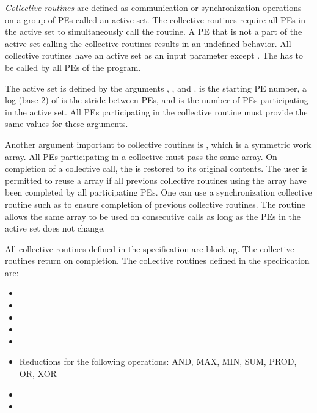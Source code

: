 \emph{Collective routines} are defined as communication or synchronization
operations on a group of \acp{PE} called an active set. The collective
routines require all \acp{PE} in the active set to simultaneously call the
routine.  A \ac{PE} that is not a part of the active set calling the collective
routines results in an undefined behavior.  All collective routines have an
active set as an input parameter except . 
The  has to be called by all \acp{PE} of the 
\openshmem program. 

The active set is defined by the arguments , ,
and .   is the starting \ac{PE} number, a log (base
2) of  is the stride between \acp{PE}, and  is
the number of \acp{PE} participating in the active set.  All \acp{PE}
participating in the collective routine must provide the same values for these
arguments. 
 
Another argument important to collective routines is , which is a
symmetric work array.  All \acp{PE} participating in a collective must pass the
same  array.  On completion of a collective call, the  is
restored to its original contents.  The user is permitted to reuse a 
array if all previous collective routines using the  array have been
completed by all participating \acp{PE}.  One can use a synchronization
collective routine such as  to ensure completion of previous collective
routines. The  routine allows the same  array to
be used on consecutive calls as long as the \acp{PE} in the active set does not change. 

All collective routines defined in the specification are blocking.  The
collective routines return on completion.  The collective routines defined in
the \openshmem specification are:

\begin{itemize}
\item {}
\item {}
\item {}
\item {}
\item {}
\item Reductions for the following operations: AND, MAX, MIN, SUM, PROD, OR, XOR
\item {}
\item {}
\end{itemize}
